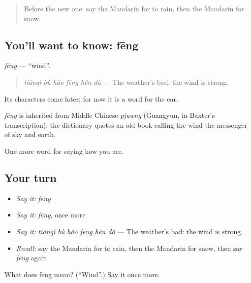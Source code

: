\label{lesson:ZH-C66-feng}



\begin{quote}
Before the new one: say the Mandarin for to rain, then the Mandarin for snow.
\end{quote}

\subsection*{You'll want to know: fēng}
\emph{fēng} — \textquotedblleft{}wind\textquotedblright{}.

\begin{quote}
\emph{tiānqì bù hǎo fēng hěn dà} — The weather's bad: the wind is strong.
\end{quote}

Its characters come later; for now it is a word for the ear.

\begin{cousinweb}
\emph{fēng} is inherited from Middle Chinese \emph{pjuwng} (Guangyun, in Baxter's transcription); the dictionary quotes an old book calling the wind the messenger of sky and earth.
\end{cousinweb}

\begin{grammarlens}[title={What you've built}]
One more word for saying how you are.
\end{grammarlens}

\subsection*{Your turn}
\begin{itemize}
\raggedright
  \item \emph{Say it:} \emph{fēng}
  \item \emph{Say it:} \emph{fēng}, once more
  \item \emph{Say it:} \emph{tiānqì bù hǎo fēng hěn dà} — The weather's bad: the wind is strong.
  \item \emph{Recall:} say the Mandarin for to rain, then the Mandarin for snow, then say \emph{fēng} again
\end{itemize}

\begin{tcolorbox}[breakable,colback=teal!4,colframe=teal!35!black,title={Before you move on}]
What does fēng mean? (\textquotedblleft{}Wind\textquotedblright{}.) Say it once more.
\end{tcolorbox}

